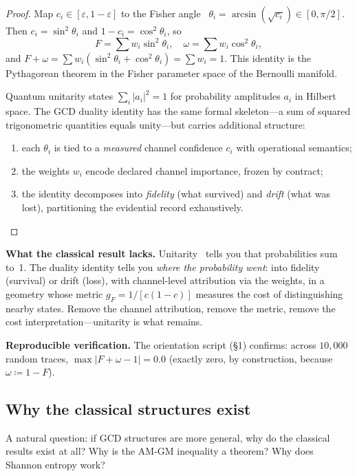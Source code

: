 \documentclass[
  aps,
  prd,
  twocolumn,
  superscriptaddress,
  nofootinbib,
  floatfix
]{revtex4-2}
\newcommand{\eps}{\varepsilon}
\newcommand{\beq}{\begin{equation}}
\newcommand{\eeq}{\end{equation}}
\begin{document}
\begin{proof}
Map $c_i \in [\eps, 1{-}\eps]$ to the Fisher
angle~\cite{fisher1925,amari2016information}
$\theta_i = \arcsin(\sqrt{c_i}) \in [0, \pi/2]$.  Then
$c_i = \sin^2\theta_i$ and $1 - c_i = \cos^2\theta_i$, so
\beq
  F = \sum w_i \sin^2\!\theta_i, \quad
  \omega = \sum w_i \cos^2\!\theta_i,
\eeq
and $F + \omega = \sum w_i(\sin^2\!\theta_i +
\cos^2\!\theta_i) = \sum w_i = 1$.  This identity is
the Pythagorean theorem in the Fisher parameter space of
the Bernoulli manifold.

Quantum unitarity states $\sum_i |a_i|^2 = 1$ for
probability amplitudes $a_i$ in Hilbert space.  The GCD
duality identity has the same formal skeleton---a sum of
squared trigonometric quantities equals unity---but carries
additional structure:
\begin{enumerate}[leftmargin=*,label=(\alph*)]
\item each $\theta_i$ is tied to a \emph{measured}
  channel confidence $c_i$ with operational semantics;
\item the weights $w_i$ encode declared channel
  importance, frozen by contract;
\item the identity decomposes into \emph{fidelity}
  (what survived) and \emph{drift} (what was lost),
  partitioning the evidential record exhaustively.
\end{enumerate}
\end{proof}

\noindent\textbf{What the classical result lacks.}
Unitarity~\cite{dirac1930principles,weinberg1995qft1} tells
you that probabilities sum to~1.  The duality identity tells
you \emph{where the probability went}: into fidelity (survival) or drift (loss), with
channel-level attribution via the weights, in a geometry
whose metric $g_F = 1/[c(1{-}c)]$ measures the cost of
distinguishing nearby states.  Remove the channel
attribution, remove the metric, remove the cost
interpretation---unitarity is what remains.

\noindent\textbf{Reproducible verification.}
The orientation script (\S1) confirms: across $10{,}000$
random traces, $\max|F + \omega - 1| = 0.0$ (exactly zero,
by construction, because $\omega \coloneqq 1 - F$).

\subsection{Why the classical structures exist}

A natural question: if GCD structures are more general,
why do the classical results exist at all?  Why is the
AM-GM inequality a theorem?  Why does Shannon entropy work?
\end{document}
